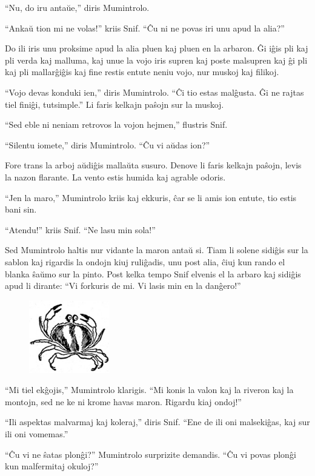``Nu, do iru antaŭe,'' diris Mumintrolo.

``Ankaŭ tion mi ne volas!'' kriis Snif. ``Ĉu ni ne povas iri unu apud la alia?''

Do ili iris unu proksime apud la alia pluen kaj pluen en la arbaron. Ĝi iĝis pli kaj pli verda kaj malluma, kaj unue la vojo iris supren kaj poste malsupren kaj ĝi pli kaj pli mallarĝiĝis kaj fine restis entute neniu vojo, nur muskoj kaj filikoj.

``Vojo devas konduki ien,'' diris Mumintrolo. ``Ĉi tio estas malĝusta. Ĝi ne rajtas tiel finiĝi, tutsimple.'' Li faris kelkajn paŝojn sur la muskoj.

``Sed eble ni neniam retrovos la vojon hejmen,'' flustris Snif.

``Silentu iomete,'' diris Mumintrolo. ``Ĉu vi aŭdas ion?''

Fore trans la arboj aŭdiĝis mallaŭta susuro. Denove li faris kelkajn paŝojn, levis la nazon flarante. La vento estis humida kaj agrable odoris.

``Jen la maro,'' Mumintrolo kriis kaj ekkuris, ĉar se li amis ion entute, tio estis bani sin.

``Atendu!'' kriis Snif. ``Ne lasu min sola!''

Sed Mumintrolo haltis nur vidante la maron antaŭ si. Tiam li solene sidiĝis sur la sablon kaj rigardis la ondojn kiuj ruliĝadis, unu post alia, ĉiuj kun rando el blanka ŝaŭmo sur la pinto. Post kelka tempo Snif elvenis el la arbaro kaj sidiĝis apud li dirante: ``Vi forkuris de mi. Vi lasis min en la danĝero!''

\begin{figure}[htbp]
\centering
\includegraphics[width=100pt,height=90pt]{1-4.png}
\caption{}
\label{1-4}
\end{figure}

``Mi tiel ekĝojis,'' Mumintrolo klarigis. ``Mi konis la valon kaj la riveron kaj la montojn, sed ne ke ni krome havas maron. Rigardu kiaj ondoj!''

``Ili aspektas malvarmaj kaj koleraj,'' diris Snif. ``Ene de ili oni malsekiĝas, kaj sur ili oni vomemas.''

``Ĉu vi ne ŝatas plonĝi?'' Mumintrolo surprizite demandis. ``Ĉu vi povas plonĝi kun malfermitaj okuloj?''

